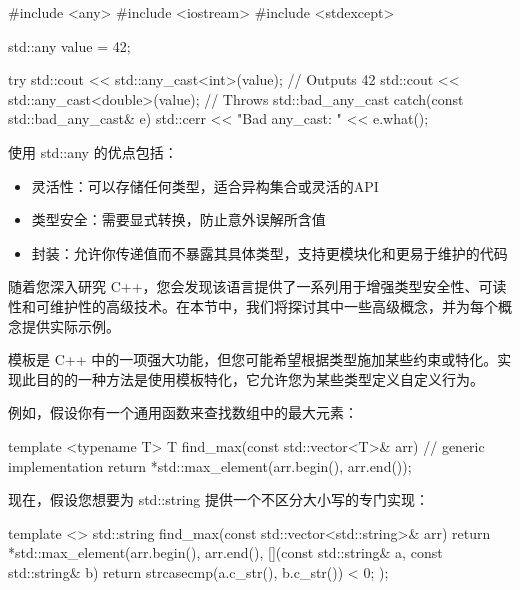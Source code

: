 \begin{cpp}
#include <any>
#include <iostream>
#include <stdexcept>

std::any value = 42;

try {
    std::cout << std::any_cast<int>(value); // Outputs 42
    std::cout << std::any_cast<double>(value); // Throws std::bad_any_cast
} catch(const std::bad_any_cast& e) {
    std::cerr << "Bad any_cast: " << e.what();
}
\end{cpp}

使用 std::any 的优点包括：

\begin{itemize}
\item
灵活性：可以存储任何类型，适合异构集合或灵活的API

\item
类型安全：需要显式转换，防止意外误解所含值

\item
封装：允许你传递值而不暴露其具体类型，支持更模块化和更易于维护的代码
\end{itemize}


随着您深入研究 C++，您会发现该语言提供了一系列用于增强类型安全性、可读性和可维护性的高级技术。在本节中，我们将探讨其中一些高级概念，并为每个概念提供实际示例。


模板是 C++ 中的一项强大功能，但您可能希望根据类型施加某些约束或特化。实现此目的的一种方法是使用模板特化，它允许您为某些类型定义自定义行为。

例如，假设你有一个通用函数来查找数组中的最大元素：

\begin{cpp}
template <typename T>
T find_max(const std::vector<T>& arr) {
    // generic implementation
    return *std::max_element(arr.begin(), arr.end());
}
\end{cpp}

现在，假设您想要为 std::string 提供一个不区分大小写的专门实现：

\begin{cpp}
template <>
std::string find_max(const std::vector<std::string>& arr) {
    return *std::max_element(arr.begin(), arr.end(),
                                [](const std::string& a, const std::string& b) {
                                    return strcasecmp(a.c_str(), b.c_str()) < 0;
                                    });
                                }
\end{cpp}

